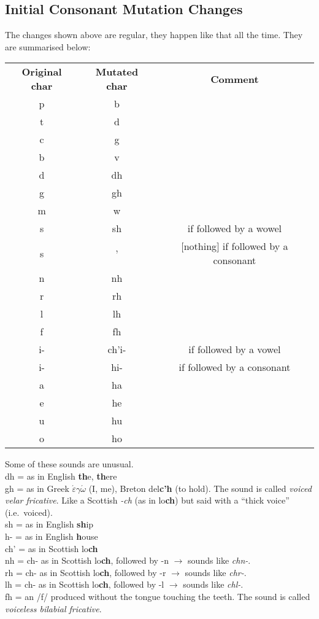 \subsection{Initial Consonant Mutation Changes}
The changes shown above are regular, they happen like that all the time. They are summarised below:
\begin{table}[H]
\centering
\begin{tabular}{ccc}
  \toprule
  \textbf{Original char} & \textbf{Mutated char} & \textbf{Comment}\\
  \cmidrule(lr){1-1}\cmidrule(lr){2-2}\cmidrule(lr){3-3}
  p & b & \\
  t & d & \\
  c & g & \\
  b & v & \\
  d & dh & \\
  g & gh & \\
  m & w & \\
  s & sh & if followed by a wowel\\
  s & ' & $[$nothing$]$ if followed by a consonant\\
  n & nh & \\
  r & rh & \\
  l & lh & \\
  f & fh & \\
  i- & ch'i- & if followed by a vowel\\
  i- & hi- & if followed by a consonant\\
  a & ha & \\
  e & he & \\
  u & hu & \\
  o & ho & \\
  \bottomrule
\end{tabular}
\label{summary_mutated_chars}
\end{table}

Some of these sounds are unusual.\\
dh = as in English \textbf{th}e, \textbf{th}ere\\
gh = as in Greek $\acute{\varepsilon}$\textbf{$\gamma$}$\acute{\omega}$ (I, me), Breton del\textbf{c'h} (to hold). The sound is called \textit{voiced velar fricative}. Like a Scottish \textit{-ch} (as in lo\textbf{ch}) but said with a ``thick voice'' (i.e.\ voiced).\\
sh = as in English \textbf{sh}ip\\
h- = as in English \textbf{h}ouse\\
ch' = as in Scottish lo\textbf{ch}\\
nh = ch- as in Scottish lo\textbf{ch}, followed by -n $\rightarrow$ sounds like \textit{chn-}.\\
rh = ch- as in Scottish lo\textbf{ch}, followed by -r $\rightarrow$ sounds like \textit{chr-}.\\
lh = ch- as in Scottish lo\textbf{ch}, followed by -l $\rightarrow$ sounds like \textit{chl-}.\\
fh = an /f/ produced without the tongue touching the teeth. The sound is called \textit{voiceless bilabial fricative}.\\

